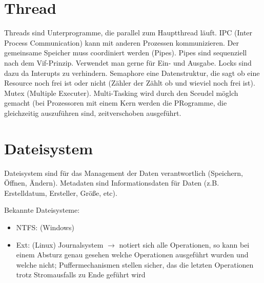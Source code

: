 \documentclass[a4paper,final]{report}
\begin{document}
{\chapter{Thread}

Threads sind Unterprogramme, die parallel zum Hauptthread läuft. IPC (Inter Process Communication) kann mit anderen Prozessen kommunizieren.
Der gemeinsame Speicher muss coordiniert werden (Pipes). Pipes sind sequenziell nach dem Vif-Prinzip. Verwendet man gerne für Ein- und Ausgabe. Locks sind dazu da Interupts zu verhindern. Semaphore eine Datenstruktur, die sagt ob eine Resource noch frei ist oder nicht (Zähler der Zählt ob und wieviel noch frei ist). Mutex (Multiple Executer). Multi-Tasking wird durch den Sceudel möglch gemacht (bei Prozessoren mit einem Kern werden die PRogramme, die gleichzeitig auszuführen sind, zeitverschoben ausgeführt. 

\chapter{Dateisystem}

Dateisystem sind für das Management der Daten verantwortlich (Speichern, Öffnen, Ändern). Metadaten sind Informationsdaten für Daten (z.B. Erstelldatum, Ersteller, Größe, etc).


Bekannte Dateisysteme:

\begin{itemize}
\item NTFS: (Windows)
\item Ext: (Linux) Journalsystem $\rightarrow$ notiert sich alle Operationen, so kann bei einem Absturz genau gesehen welche Operationen ausgeführt wurden und welche nicht; Puffermechanismen stellen sicher, das die letzten Operationen trotz Stromausfalls zu Ende geführt wird
\end{itemize}

}
\end{document}
